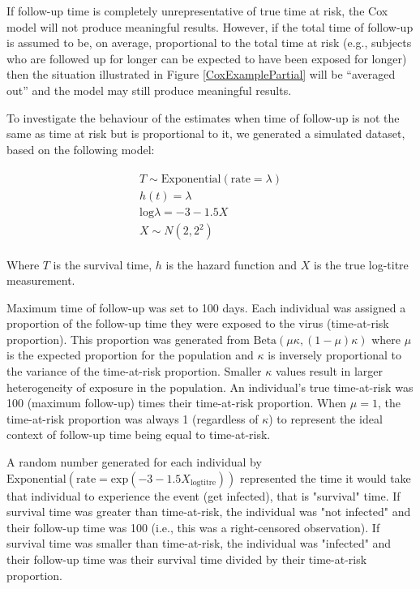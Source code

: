 If follow-up time is completely unrepresentative of true time at risk, the Cox model will not produce meaningful results. However, if the total time of follow-up is assumed to be, on average, proportional to the total time at risk (e.g., subjects who are followed up for longer can be expected to have been exposed for longer) then the situation illustrated in Figure  \ref{CoxExamplePartial} will be ``averaged out'' and the model may still produce meaningful results.

To investigate the behaviour of the estimates when time of follow-up is not the same as time at risk but is proportional to it, we generated a simulated dataset, based on the following model:

\begin{align*}
	\begin{gathered}
		T \sim \text{Exponential}(\text{rate} = \lambda) \\
		h(t) = \lambda \\
		\text{log}\lambda = -3 - 1.5 X \\
		X \sim N(2, 2^2)
	\end{gathered}
\end{align*}

Where $T$ is the survival time, $h$ is the hazard function and $X$ is the true log-titre measurement.

Maximum time of follow-up was set to 100 days. Each individual was assigned a proportion of the follow-up time they were exposed to the virus (time-at-risk proportion). This proportion was generated from $\text{Beta}(\mu \kappa, (1 - \mu) \kappa)$ where $\mu$ is the expected proportion for the population and $\kappa$ is inversely proportional to the variance of the time-at-risk proportion. Smaller $\kappa$ values result in larger heterogeneity of exposure in the population. An individual's true time-at-risk was 100 (maximum follow-up) times their time-at-risk proportion. When $\mu = 1$, the time-at-risk proportion was always 1 (regardless of $\kappa$) to represent the ideal context of follow-up time being equal to time-at-risk.

A random number generated for each individual by $\text{Exponential}(\text{rate} = \text{exp}(-3 - 1.5 X_{\text{logtitre}}) )$ represented the time it would take that individual to experience the event (get infected), that is "survival" time. If survival time was greater than time-at-risk, the individual was "not infected" and their follow-up time was 100 (i.e., this was a right-censored observation). If survival time was smaller than time-at-risk, the individual was "infected" and their follow-up time was their survival time divided by their time-at-risk proportion.

